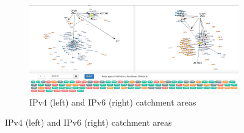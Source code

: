 \begin{figure}[!ht]
	\begin{subfigure}{1\textwidth}
		\centering
		\includegraphics[width=6.5in]{img/j-root-vis}
		\caption{IPv4 (left) and IPv6 (right) catchment areas}
		\label{fig:ch04:j-root-6-16}
	\end{subfigure}
	

\end{figure}
